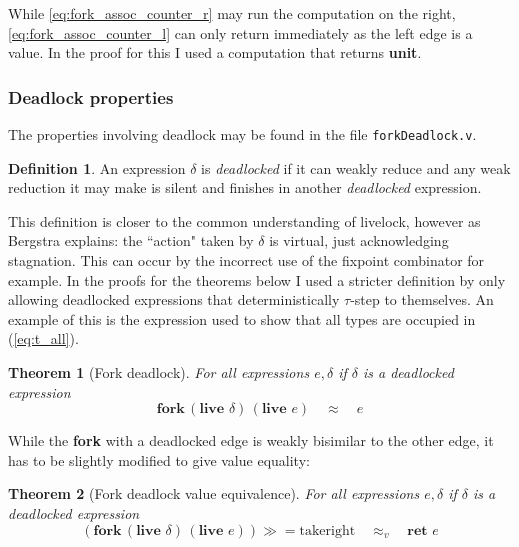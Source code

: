 \documentclass[12pt,twoside,notitlepage]{report}
\theoremstyle{plain}%
\newtheorem{thm}{Theorem}[section]
\theoremstyle{definition}
\newtheorem{defn}{Definition}[section]
\theoremstyle{remark}
\begin{document}
While \ref{eq:fork_assoc_counter_r} may run the computation on the right, \ref{eq:fork_assoc_counter_l} can only return immediately as the left edge is a value. In the proof for this I used a computation that returns \textbf{unit}.

\subsubsection{Deadlock properties}
The properties involving deadlock may be found in the file \verb|forkDeadlock.v|.

\begin{defn}
An expression $ \delta $ is \textit{deadlocked} if it can weakly reduce and any weak reduction it may make is silent and finishes in another \textit{deadlocked} expression. 
\end{defn}

This definition is closer to the common understanding of livelock, however as Bergstra\cite{bergstra1984process} explains: the ``action" taken by $ \delta $ is virtual, just acknowledging stagnation. This can occur by the incorrect use of the fixpoint combinator for example. In the proofs for the theorems below I used a stricter definition by only allowing deadlocked expressions that deterministically $ \tau $-step to themselves. An example of this is the expression used to show that all types are occupied in (\ref{eq:t_all}).
\begin{thm}[Fork deadlock]
For all expressions $ e, \delta$ if $ \delta $ is a deadlocked expression
\[  \textbf{fork}\,(\textbf{live }\delta)\,(\textbf{live }e)\quad \approx \quad e \]
\end{thm}

While the \textbf{fork} with a deadlocked edge is weakly bisimilar to the other edge, it has to be slightly modified to give value equality:

\begin{thm}[Fork deadlock value equivalence]
For all expressions $ e, \delta$ if $ \delta $ is a deadlocked expression
\[  (\textbf{fork}\,(\textbf{live }\delta)\,(\textbf{live }e))\gg=\text{takeright}\quad \approx_v \quad \textbf{ret }e \]
\end{thm}
\end{document}
